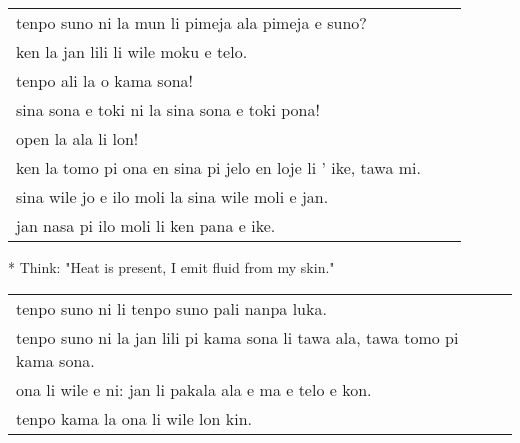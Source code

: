 \begin{supertabular}{p{5,5cm}|ll}
tenpo suno ni la mun li pimeja ala pimeja e suno? &&  \\ %
ken la jan lili li wile moku e telo.  &&   \\ %
tenpo ali la o kama sona!   &&  \\ %
sina sona e toki ni la sina sona e toki pona!   &&  \\ %
open la ala li lon! &&  \\  %
ken la tomo pi ona en sina pi jelo en loje li ' ike, tawa mi. &&  \\  %
sina wile jo e ilo moli la sina wile moli e jan. &&  \\  %
jan nasa pi ilo moli li ken pana e ike. &&  \\ %
\end{supertabular}

* Think: "Heat is present, I emit fluid from my skin."

\begin{supertabular}{p{5,5cm}|ll}
tenpo suno ni li tenpo suno pali nanpa luka. && \\ %
tenpo suno ni la jan lili pi kama sona li tawa ala, tawa tomo pi kama sona. && \\ %
ona li wile e ni: jan li pakala ala e ma e telo e kon. && \\ %
tenpo kama la ona li wile lon kin. && \\ %
\end{supertabular}

